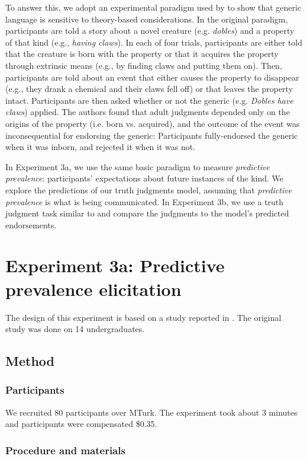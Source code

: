 \documentclass[12pt,letterpaper]{article}
\begin{document}
To answer this, we adopt an experimental paradigm used by  to show that generic language is sensitive to theory-based considerations.
In the original paradigm, participants are told a story about a novel creature (e.g. \emph{dobles}) and a property of that kind (e.g., \emph{having claws}).
In each of four trials, participants are either told that the creature is born with the property or that it acquires the property through extrinsic means (e.g., by finding claws and putting them on). 
Then, participants are told about an event that either causes the property to disappear (e.g., they drank a chemical and their claws fell off) or that leaves the property intact. 
Participants are then asked whether or not the generic (e.g. \emph{Dobles have claws}) applied.
The authors found that adult judgments depended only on the origins of the property (i.e. born vs. acquired), and the outcome of the event was inconsequential for endorsing the generic: Participants fully-endorsed the generic when it was inborn, and rejected it when it was not.

In Experiment 3a, we use the same basic paradigm to measure \emph{predictive prevalence}: participants' expectations about future instances of the kind.
We explore the predictions of our truth judgments model, assuming that \emph{predictive prevalence} is what is being communicated.
In Experiment 3b, we use a truth judgment task similar to  and compare the judgments to the model's predicted endorsements.

\section*{Experiment 3a: Predictive prevalence elicitation}

The design of this experiment is based on a study reported in .
The original study was done on 14 undergraduates.

\subsection*{Method}

\subsubsection*{Participants}
We recruited 80 participants over MTurk.  
The experiment took about 3 minutes and participants were compensated \$0.35.

\subsubsection*{Procedure and materials}
\end{document}
